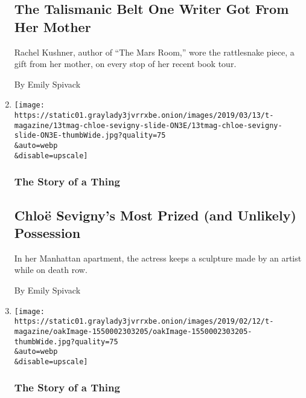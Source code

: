 \begin{enumerate}
  \hypertarget{the-talismanic-belt-one-writer-got-from-her-mother}{%
  \subsection{The Talismanic Belt One Writer Got From Her
  Mother}\label{the-talismanic-belt-one-writer-got-from-her-mother}}

  Rachel Kushner, author of ``The Mars Room,'' wore the rattlesnake
  piece, a gift from her mother, on every stop of her recent book tour.

  By Emily Spivack
\item
  \href{/2019/03/19/t-magazine/chloe-sevigny-damien-echols.html}{}

  \texttt{[image: https://static01.graylady3jvrrxbe.onion/images/2019/03/13/t-magazine/13tmag-chloe-sevigny-slide-ON3E/13tmag-chloe-sevigny-slide-ON3E-thumbWide.jpg?quality=75\\\&auto=webp\\\&disable=upscale]}

  \hypertarget{the-story-of-a-thing-6}{%
  \subsubsection{The Story of a Thing}\label{the-story-of-a-thing-6}}

  \hypertarget{chlouxeb-sevignys-most-prized-and-unlikely-possession}{%
  \subsection{Chloë Sevigny's Most Prized (and Unlikely)
  Possession}\label{chlouxeb-sevignys-most-prized-and-unlikely-possession}}

  In her Manhattan apartment, the actress keeps a sculpture made by an
  artist while on death row.

  By Emily Spivack
\item
  \href{/2019/02/14/t-magazine/martha-rosler.html}{}

  \texttt{[image: https://static01.graylady3jvrrxbe.onion/images/2019/02/12/t-magazine/oakImage-1550002303205/oakImage-1550002303205-thumbWide.jpg?quality=75\\\&auto=webp\\\&disable=upscale]}

  \hypertarget{the-story-of-a-thing-7}{%
  \subsubsection{The Story of a Thing}\label{the-story-of-a-thing-7}}

  \hypertarget{the-historical-portraits-one-artist-looks-at-every-day}{%
}
\end{enumerate}

